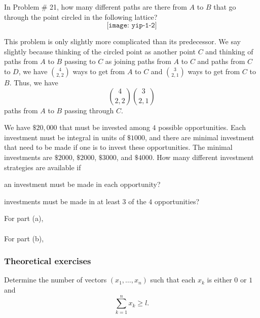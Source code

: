 \begin{problem}[Ross, \S 1, \# 22]
  In Problem \# 21, how many different paths are there from \(A\) to \(B\)
  that go through the point circled in the following lattice?
  \[
    \texttt{[image: yip-1-2]}
  \]
\end{problem}
\begin{solution*}
  This problem is only slightly more complicated than its predecessor. We
  say slightly because thinking of the circled point as another point \(C\)
  and thinking of paths from \(A\) to \(B\) passing to \(C\) as joining
  paths from \(A\) to \(C\) and paths from \(C\) to \(D\), we have
  \(\binom{4}{2,2}\) ways to get from \(A\) to \(C\) and \(\binom{3}{2,1}\)
  ways to get from \(C\) to \(B\). Thus, we have
  \[
    \binom{4}{2,2}\binom{3}{2,1}
  \]
  paths from \(A\) to \(B\) passing through \(C\).
\end{solution*}

\begin{problem}[Ross, \S 1, \# 33]
  We have \(\$ 20,\!000\) that must be invested among \(4\) possible
  opportunities. Each investment must be integral in units of \(\$1000\),
  and there are minimal investment that need to be made if one is to invest
  these opportunities. The minimal investments are \(\$2000\), \(\$2000\),
  \(\$3000\), and \(\$4000\). How many different investment strategies are
  available if
  \begin{alphlist}
  \item an investment must be made in each opportunity?
  \item investments must be made in at least \(3\) of the \(4\)
    opportunities?
  \end{alphlist}
\end{problem}
\begin{solution*}
  For part (a),
  \\\\
  For part (b),
\end{solution*}

\subsubsection{Theoretical exercises}
\begin{problem}[Ross, \S 1, \# 5]
  Determine the number of vectors \((x_1,\dotsc,x_n)\) such that each
  \(x_k\) is either \(0\) or \(1\) and
  \[
    \sum_{k=1}^n x_k\geq l.
  \]
\end{problem}
\begin{solution*}
\end{solution*}

